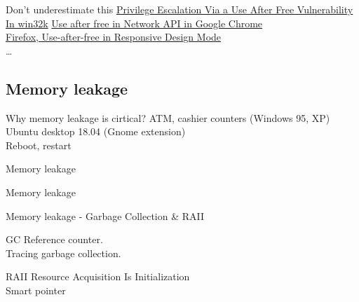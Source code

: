 \documentclass{beamer}
\begin{document}
\begin{CJK*}{UTF8}{bsmi}
    \begin{frame}{Don't underestimate this}
        \href{https://www.zerodayinitiative.com/blog/2021/5/3/cve-2021-26900-privilege-escalation-via-a-use-after-free-vulnerability-in-win32k}
        {Privilege Escalation Via a Use After Free Vulnerability In win32k}
        \href{https://www.cvedetails.com/cve-details.php?cve_id=CVE-2021-21214}
        {Use after free in Network API in Google Chrome}\\
        \href{https://www.mozilla.org/en-US/security/advisories/mfsa2021-16/\#CVE-2021-23995}
        {Firefox, Use-after-free in Responsive Design Mode}\\
        \dots
    \end{frame}

    \subsection{Memory leakage}
    \begin{frame}{Why memory leakage is cirtical?}
        ATM, cashier counters (Windows 95, XP)\\
        Ubuntu desktop 18.04 (Gnome extension)\\
        Reboot, restart
    \end{frame}

    \begin{frame}{Memory leakage}
        
    \end{frame}

    \begin{frame}{Memory leakage}
        
    \end{frame}

    \begin{frame}{Memory leakage - Garbage Collection \& RAII}
        \begin{multicols*}{2}
            \begin{beamerboxesrounded}[width=.45\textwidth]{GC}
                Reference counter.\\
                Tracing garbage collection.
            \end{beamerboxesrounded}
            \begin{beamerboxesrounded}[width=.45\textwidth]{RAII}
                Resource Acquisition Is Initialization\\
                Smart pointer
            \end{beamerboxesrounded}
        \end{multicols*}
    \end{frame}


\end{CJK*}
\end{document}

